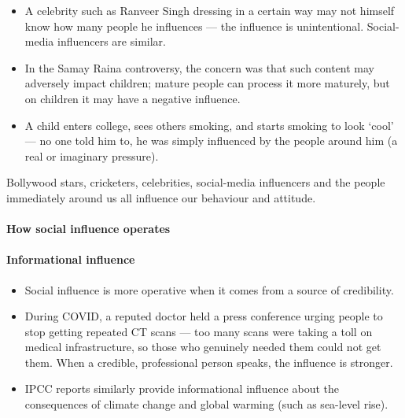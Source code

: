 \begin{ExampleBox}
\begin{itemize}
\item A celebrity such as Ranveer Singh dressing in a certain way may not himself know how many people he influences --- the influence is unintentional. Social-media influencers are similar.
\item In the Samay Raina controversy, the concern was that such content may adversely impact children; mature people can process it more maturely, but on children it may have a negative influence.
\item A child enters college, sees others smoking, and starts smoking to look `cool' --- no one told him to, he was simply influenced by the people around him (a real or imaginary pressure).
\end{itemize}
\end{ExampleBox}

Bollywood stars, cricketers, celebrities, social-media influencers and the people immediately around us all influence our behaviour and attitude.

\paragraph{How social influence operates}

\paragraph{Informational influence}
\begin{itemize}
\item Social influence is more operative when it comes from a source of credibility.
\end{itemize}

\begin{ExampleBox}
\begin{itemize}
\item During COVID, a reputed doctor held a press conference urging people to stop getting repeated CT scans --- too many scans were taking a toll on medical infrastructure, so those who genuinely needed them could not get them. When a credible, professional person speaks, the influence is stronger.
\item IPCC reports similarly provide informational influence about the consequences of climate change and global warming (such as sea-level rise).
\end{itemize}
\end{ExampleBox}

